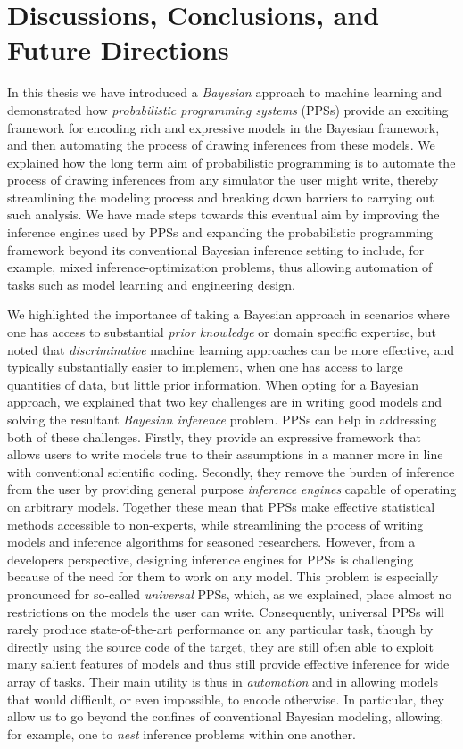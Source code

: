 
\chapter{Discussions, Conclusions, and Future Directions}
\label{chp:discussion}

In this thesis we have introduced a \emph{Bayesian} approach to machine learning and demonstrated
how \emph{probabilistic programming systems} (PPSs) provide an exciting framework for
encoding rich and expressive models in the Bayesian framework, and then automating the process
of drawing inferences from these models.  We explained how the long term
aim of probabilistic programming is to automate the process of drawing inferences from any simulator
the user might write, thereby streamlining the modeling process and breaking down barriers to carrying out such
analysis.  We have made steps towards this eventual aim by improving the inference
engines used by PPSs and expanding the probabilistic programming framework beyond its conventional
Bayesian inference setting to include, for example, 
mixed inference-optimization problems, thus
allowing automation of tasks such as model learning and engineering design.

We highlighted the importance of taking a Bayesian approach in scenarios where one has
access to substantial \emph{prior knowledge} or domain specific expertise, but noted that
\emph{discriminative} machine learning approaches can be more effective, and typically substantially
easier to implement, when one has access to large quantities of data, but little prior information.
When opting for a Bayesian approach, we explained that two key challenges are in writing good models
and solving the resultant \emph{Bayesian inference} problem.
PPSs can help in addressing both of these challenges.  Firstly, they provide an expressive framework
that allows users to write models true to their assumptions in a manner more in line with conventional
scientific coding.  Secondly, they remove the burden of inference from the user by providing general
purpose \emph{inference engines} capable of operating on arbitrary models.
Together these mean that PPSs make effective statistical methods accessible to non-experts, while
streamlining the process of writing models and inference algorithms for seasoned researchers.
However, from a developers perspective, designing inference engines for PPSs is challenging because of
 the need for them to work on any model.
 This problem is especially pronounced
for so-called \emph{universal} PPSs, which, as we explained, place almost no restrictions on the
models the user can write.  Consequently,
universal PPSs will rarely produce state-of-the-art performance on any particular task, though
by directly using the source code of the target, they are still often able to exploit many salient
features of models and thus still provide effective inference for wide array of tasks.
  Their main
utility is thus in \emph{automation} and in allowing models that would difficult, or even impossible,
to encode otherwise.  In particular, they allow us to go beyond
the confines of conventional Bayesian  modeling, allowing, for example, one to \emph{nest} 
inference problems within one another.

